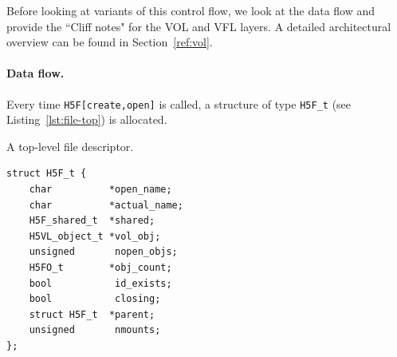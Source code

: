 Before looking at variants of this control flow, we look at the data flow and provide the ``Cliff notes" for the VOL and VFL layers. A detailed architectural overview can be found in Section~\ref{ref:vol}.

\paragraph{Data flow.} Every time \texttt{H5F[create,open]} is called, a structure of type \texttt{H5F\_t} (see Listing~\ref{lst:file-top}) is allocated.

\begin{listing}
\centering
\caption{A top-level file descriptor.}
\label{lst:file-top}
\begin{verbatim}
struct H5F_t {
    char          *open_name;
    char          *actual_name;
    H5F_shared_t  *shared;
    H5VL_object_t *vol_obj;
    unsigned       nopen_objs;
    H5FO_t        *obj_count;
    bool           id_exists;
    bool           closing;
    struct H5F_t  *parent;
    unsigned       nmounts;
};
\end{verbatim}
\end{listing}

